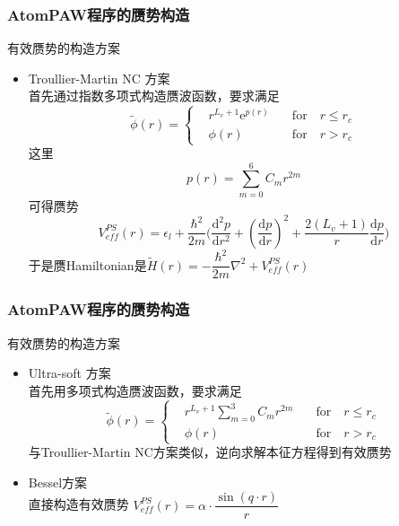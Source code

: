 \documentclass[cjk,slidestop,compress,mathserif,blue]{beamer}
\begin{document}
\frame
{
	\frametitle{\textrm{AtomPAW}程序的赝势构造}
	有效赝势的构造方案
	\begin{itemize}
		\item \textrm{Troullier-Martin NC} 方案 \\
	首先通过指数多项式构造赝波函数，要求满足
	\begin{displaymath}
		\tilde\phi(r)=\left\{
			\begin{aligned}
				&r^{L_v+1}\mathrm{e}^{p(r)}\quad &\mathrm{for}\quad r\leqslant r_c \\
				&\phi(r)\quad &\mathrm{for}\quad r>r_c
			\end{aligned}
			\right.
	\end{displaymath}
	这里$$p(r)=\sum_{m=0}^6C_mr^{2m}$$
	可得赝势 
	$$V_{e\!f\!f}^{PS}(r)=\epsilon_l+\dfrac{\hbar^2}{2m}\bigg(\dfrac{\mathrm{d}^2p}{\mathrm{d}r^2}+(\dfrac{\mathrm{d}p}{\mathrm{d}r})^2+\dfrac{2(L_v+1)}r\dfrac{\mathrm{d}p}{\mathrm{d}r}\bigg)$$
	于是赝\textrm{Hamiltonian}是$\tilde H(r)=-\dfrac{\hbar^2}{2m}\nabla^2+V_{e\!f\!f}^{PS}(r)$
	\end{itemize}
}
\frame
{
	\frametitle{\textrm{AtomPAW}程序的赝势构造}
	有效赝势的构造方案
	\begin{itemize}
		\item \textrm{Ultra-soft} 方案 \\
	首先用多项式构造赝波函数，要求满足
	\begin{displaymath}
		\tilde\phi(r)=\left\{
			\begin{aligned}
				&r^{L_v+1}\sum_{m=0}^3C_mr^{2m}\quad &\mathrm{for}\quad r\leqslant r_c \\
				&\phi(r)\quad &\mathrm{for}\quad r>r_c
			\end{aligned}
			\right.
	\end{displaymath}
	与\textrm{Troullier-Martin NC}方案类似，逆向求解本征方程得到有效赝势
		\item \textrm{Bessel}方案\\
			直接构造有效赝势 $V_{e\!f\!f}^{PS}(r)=\alpha\cdot\dfrac{\sin(q\cdot r)}r$
	\end{itemize}
}
\end{document}
